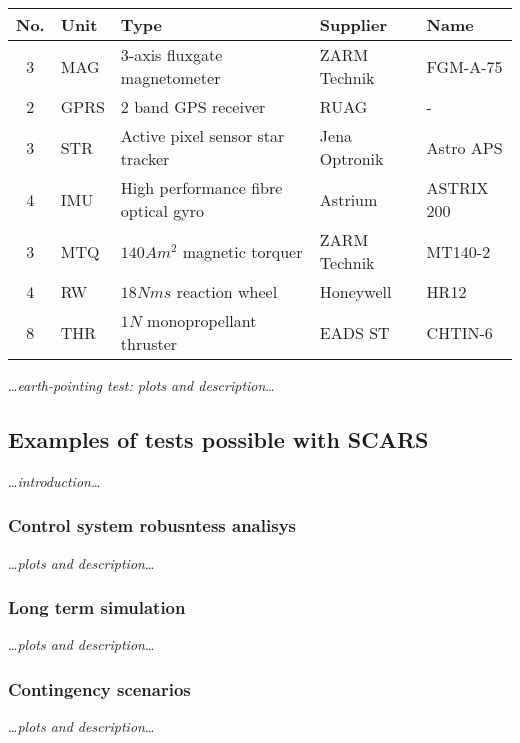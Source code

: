     \begin{center}    
        \small
        \begin{tabularx}{\textwidth}{ c l X l l }
            \textbf{No.} & \textbf{Uni}t & \textbf{Type} & \textbf{Supplier} & \textbf{Name} \\ \hline
            3 & MAG & 3-axis fluxgate magnetometer & ZARM Technik & FGM-A-75 \\
            2 & GPRS & 2 band GPS receiver & RUAG & - \\
            3 & STR  & Active pixel sensor star tracker & Jena Optronik & Astro APS \\
            4 & IMU & High performance fibre optical gyro & Astrium & ASTRIX 200 \\
            3 & MTQ & $140 Am^2$ magnetic torquer & ZARM Technik & MT140-2\\
            4 & RW & $18 Nms$ reaction wheel & Honeywell & HR12 \\
            8 & THR & $1N$ monopropellant thruster & EADS ST &CHTIN-6
        \end{tabularx}
    \end{center}\label{table:sentinel-adcs}

    \dots\textit{earth-pointing test: plots and description}\dots

\subsection{Examples of tests possible with SCARS}
    \dots\textit{introduction}\dots

    \subsubsection{Control system robusntess analisys}
        \dots\textit{plots and description}\dots

    \subsubsection{Long term simulation}
        \dots\textit{plots and description}\dots

    \subsubsection{Contingency scenarios}
        \dots\textit{plots and description}\dots
